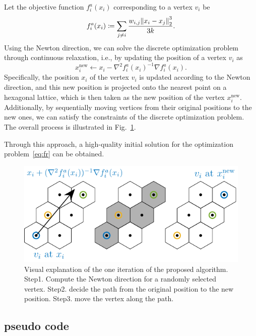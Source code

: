 \documentclass[dvipdfmx,lettersize,journal]{IEEEtran}
\newcommand{\defeq}{\coloneqq}
\begin{document}
Let the objective function $f^a_i(x_i)$ corresponding to a vertex $v_i$ be
\begin{equation*}
  f^a_i(x_i) \defeq \sum_{j \neq i} \frac{w_{i,j}\norm{x_i - x_j}_2^3}{3k}.
\end{equation*}
Using the Newton direction, we can solve the discrete optimization problem through continuous relaxation, i.e., by updating the position of a vertex $v_i$ as
\begin{equation*}
  x_i^\mathrm{new} \gets x_i - \nabla^2 f^a_i(x_i)^{-1} \nabla f^a_i(x_i).
\end{equation*}
Specifically, the position $x_i$ of the vertex $v_i$ is updated according to the Newton direction, and this new position is projected onto the nearest point on a hexagonal lattice, which is then taken as the new position of the vertex $x_i^\mathrm{new}$.
Additionally, by sequentially moving vertices from their original positions to the new ones, we can satisfy the constraints of the discrete optimization problem. The overall process is illustrated in Fig.~\ref{fig:hex}.

Through this approach, a high-quality initial solution for the optimization problem~\eqref{eq:fr} can be obtained.

\begin{figure}[t]
  \centering
  \includegraphics[width=\columnwidth]{hex/hex.pdf}
  \caption{Visual explanation of the one iteration of the proposed algorithm. Step1. Compute the Newton direction for a randomly selected vertex. Step2. decide the path from the original position to the new position. Step3. move the vertex along the path.}
  \label{fig:hex}
\end{figure}

\subsection{pseudo code}\label{ssec:pseudoCode}
\end{document}
